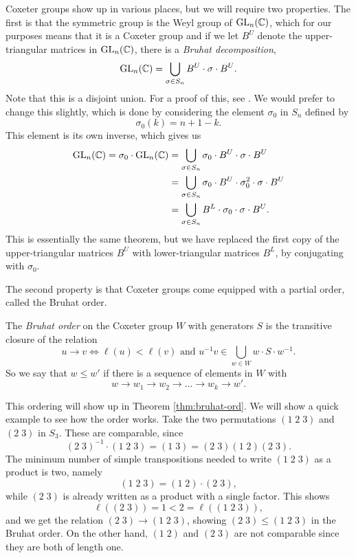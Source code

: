 Coxeter groups show up in various places, but we will require two
properties. The first is that the symmetric group is the Weyl group of
$\operatorname{GL}_n(\mathbb{C})$, which for our purposes means that it is a Coxeter group
and if we let $B^U$ denote the upper-triangular matrices in
$\operatorname{GL}_n(\mathbb{C})$, there is a \textit{Bruhat decomposition},
\[ \operatorname{GL}_n(\mathbb{C}) = \bigcup_{\sigma \in S_n} B^U \cdot \sigma \cdot B^U. \]
Note that this is a disjoint union. For a proof of this, see
\cite[Theorem 4.3]{hiller}. We
would prefer to change this slightly, which is done by considering the
element $\sigma_0$ in $S_n$ defined by
\[ \sigma_0(k) = n+1-k. \]
This element is its own inverse, which gives us
\begin{align*}
  \operatorname{GL}_n(\mathbb{C}) = \sigma_0 \cdot \operatorname{GL}_n(\mathbb{C}) &= \bigcup_{\sigma\in S_n}
                                         \sigma_0\cdot B^U \cdot
                                         \sigma\cdot B^U \\
                                       &= \bigcup_{\sigma\in S_n}
                                         \sigma_0\cdot B^U \cdot
                                         \sigma_0^2\cdot \sigma \cdot
                                         B^U \\
                                       &= \bigcup_{\sigma\in S_n}
                                         B^L\cdot \sigma_0\cdot
                                         \sigma\cdot B^U.
\end{align*}
This is essentially the same theorem, but we have replaced the first
copy of the upper-triangular matrices $B^U$ with lower-triangular
matrices $B^L$, by
conjugating with $\sigma_0$.

The second property is that Coxeter groups come equipped with a
partial order, called the Bruhat order.
\begin{definition}
  \label{def:bruhat-def}
  The \textit{Bruhat order} on the Coxeter group $W$ with generators
  $S$ is the transitive closure of the relation
  \[ u \to v \iff \ell(u) < \ell(v) \text{ and } u^{-1}v \in
  \bigcup_{w\in W} w
  \cdot S \cdot w^{-1}. \]
  So we say that $w \leq w'$ if there is a sequence of elements in $W$
  with
  \[ w \to w_1 \to w_2 \to \dots \to w_k \to w'. \]
\end{definition}

This ordering will show up in Theorem \ref{thm:bruhat-ord}. We will
show a quick example to see how the order works. Take the two
permutations $(1\;2\;3)$ and $(2\;3)$ in $S_3$. These are comparable,
since
\[ (2\;3)^{-1} \cdot (1\;2 \;3) = (1\;3) = (2\;3) (1\; 2) (2\; 3). \]
The minimum number of simple transpositions needed to write $(1\;2\;3)$
as a product is two, namely
\[ (1\;2\;3) = (1\;2) \cdot (2\;3), \]
while $(2\;3)$ is already written as a product with a single
factor. This shows
\[ \ell((2\;3)) = 1 < 2 = \ell((1\;2\;3)), \]
and we get the relation $(2\;3) \to (1\;2\;3)$, showing $(2\;3) \leq
(1\;2\;3)$ in the Bruhat order. On the other
hand, $(1\;2)$ and $(2\;3)$ are not comparable since they are both of
length one.

